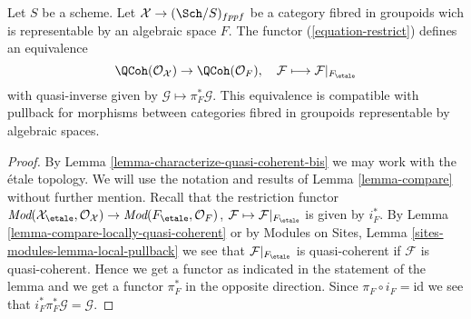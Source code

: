 \begin{lemma}
\label{lemma-compare-quasi-coherent}
Let $S$ be a scheme. Let $\mathcal{X} \to (\Sch/S)_{fppf}$ be a category
fibred in groupoids wich is representable by an algebraic space $F$.
The functor (\ref{equation-restrict}) defines an equivalence
$$
\QCoh(\mathcal{O}_\mathcal{X}) \to \QCoh(\mathcal{O}_F),\quad
\mathcal{F} \longmapsto \mathcal{F}|_{F_\etale}
$$
with quasi-inverse given by $\mathcal{G} \mapsto \pi_F^*\mathcal{G}$.
This equivalence is compatible with pullback for morphisms between
categories fibred in groupoids representable by algebraic spaces.
\end{lemma}

\begin{proof}
By Lemma \ref{lemma-characterize-quasi-coherent-bis} we may work with
the \'etale topology. We will use the notation and results of
Lemma \ref{lemma-compare} without further mention.
Recall that the restriction functor
$\textit{Mod}(\mathcal{X}_\etale, \mathcal{O}_\mathcal{X}) \to
\textit{Mod}(F_\etale, \mathcal{O}_F)$,
$\mathcal{F} \mapsto \mathcal{F}|_{F_\etale}$ is given by $i_F^*$. By
Lemma \ref{lemma-compare-locally-quasi-coherent} or by
Modules on Sites, Lemma \ref{sites-modules-lemma-local-pullback}
we see that $\mathcal{F}|_{F_\etale}$ is quasi-coherent if
$\mathcal{F}$ is quasi-coherent.
Hence we get a functor as indicated in the statement of the
lemma and we get a functor $\pi_F^*$ in the opposite direction.
Since $\pi_F \circ i_F = \text{id}$ we see that
$i_F^*\pi_F^*\mathcal{G} = \mathcal{G}$.


\end{proof}
